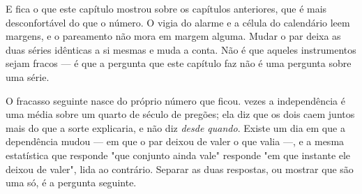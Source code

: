 E fica o que este capítulo mostrou sobre os capítulos anteriores, que é mais desconfortável do
que o número. O vigia do alarme e a célula do calendário leem margens, e o pareamento não mora em margem alguma. Mudar o par deixa as duas séries idênticas a si mesmas e muda a conta. Não é que aqueles instrumentos sejam fracos --- é que a pergunta que este capítulo faz não
é uma pergunta sobre uma série.

O fracasso seguinte nasce do próprio número que ficou. \numDependenciaExcesso{} vezes a
independência é uma média sobre um quarto de século de pregões; ela diz que os dois caem juntos mais do que a
sorte explicaria, e não diz \emph{desde quando}. Existe um dia em que a dependência mudou --- em
que o par deixou de valer o que valia ---, e a mesma estatística que responde "que conjunto ainda
vale" responde "em que instante ele deixou de valer", lida ao contrário. Separar as duas
respostas, ou mostrar que são uma só, é a pergunta seguinte.
